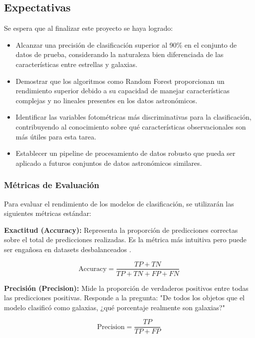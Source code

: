 \documentclass{article}
\begin{document}
\subsection{Expectativas}

Se espera que al finalizar este proyecto se haya logrado:

\begin{itemize}
    \item Alcanzar una precisión de clasificación superior al 90\% en el conjunto de datos de prueba, considerando la naturaleza bien diferenciada de las características entre estrellas y galaxias.
    \item Demostrar que los algoritmos como Random Forest proporcionan un rendimiento superior debido a su capacidad de manejar características complejas y no lineales presentes en los datos astronómicos.
    \item Identificar las variables fotométricas más discriminativas para la clasificación, contribuyendo al conocimiento sobre qué características observacionales son más útiles para esta tarea.
    \item Establecer un pipeline de procesamiento de datos robusto que pueda ser aplicado a futuros conjuntos de datos astronómicos similares.
\end{itemize}

\subsubsection{Métricas de Evaluación}

Para evaluar el rendimiento de los modelos de clasificación, se utilizarán las siguientes métricas estándar:

\textbf{Exactitud (Accuracy):} Representa la proporción de predicciones correctas sobre el total de predicciones realizadas. Es la métrica más intuitiva pero puede ser engañosa en datasets desbalanceados \cite{accuracy_metric}.

\begin{equation}
\text{Accuracy} = \frac{TP + TN}{TP + TN + FP + FN}
\end{equation}

\textbf{Precisión (Precision):} Mide la proporción de verdaderos positivos entre todas las predicciones positivas. Responde a la pregunta: "De todos los objetos que el modelo clasificó como galaxias, ¿qué porcentaje realmente son galaxias?" \cite{precision_metric}

\begin{equation}
\text{Precision} = \frac{TP}{TP + FP}
\end{equation}
\end{document}
